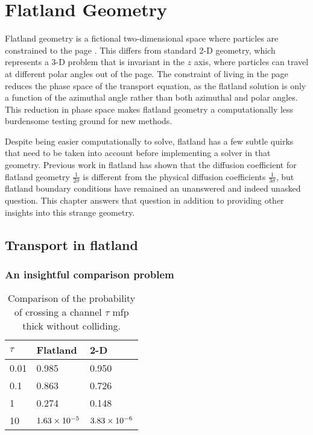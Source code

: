 
\chapter{Flatland Geometry}

Flatland geometry is a fictional two-dimensional space where particles are
constrained to the page \cite{Asa2008}. This differs from standard 2-D
geometry, which represents a 3-D problem that is invariant in the $z$ axis,
where particles can travel at different polar angles out of the page. The
constraint of living in the page reduces the phase space of the transport
equation, as the flatland solution is only a function of the azimuthal angle
rather than both azimuthal and polar angles. This reduction in phase space makes 
flatland geometry a computationally less burdensome testing ground for new
methods.

Despite being easier computationally to solve, flatland has a few subtle quirks
that need to be taken into account before implementing a solver in that
geometry. Previous work in flatland \cite{Asa2008,Lar2009c} has shown that the
diffusion coefficient for flatland geometry $\frac{1}{2\sigma}$ is different from
the physical diffusion coefficients $\frac{1}{3\sigma}$, but flatland boundary
conditions have remained an unanswered and indeed unasked question. This
chapter answers that question in addition to providing other insights into this
strange geometry.

\section{Transport in flatland}

\subsection{An insightful comparison problem}

\begin{table}[htb]
  \centering
  \begin{tabular}{lll}
\toprule
 $\tau$ & Flatland & 2-D
\\ \midrule
\phantom{1}0.01 & 0.985 & 0.950 \\
\phantom{1}0.1 & 0.863 & 0.726 \\
\phantom{1}1 & 0.274 & 0.148 \\
10 & $1.63\times 10^{-5}$ & $3.83\times 10^{-6}$
 \\
\bottomrule
  \end{tabular}
  \caption{Comparison of the probability of crossing a channel $\tau$ mfp thick
  without colliding.}
  \label{tab:collision}
\end{table}
